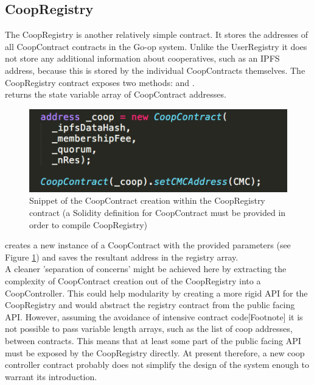 \subsection{CoopRegistry}
The CoopRegistry is another relatively simple contract. It stores the addresses of all CoopContract contracts in the Go-op system. Unlike the UserRegistry it does not store any additional information about cooperatives, such as an IPFS address, because this is stored by the individual CoopContracts themselves. The CoopRegistry contract exposes two methods:  and . \\

 returns the state variable array of CoopContract addresses. \\
 \begin{figure}
\centering
\includegraphics[width=\textwidth]{Figures/CoopRegistry}
\decoRule
\caption[]{Snippet of the CoopContract creation within the CoopRegistry contract (a Solidity definition for CoopContract must be provided in order to compile CoopRegistry) }
\label{fig:CoopRegistry}
\end{figure}

 creates a new instance of a CoopContract with the provided parameters (see Figure \ref{fig:CoopRegistry}) and saves the resultant address in the registry array.\\

A cleaner 'separation of concerns' might be achieved here by extracting the complexity of CoopContract creation out of the CoopRegistry into a CoopController. This could help modularity by creating a more rigid API for the CoopRegistry and would abstract the registry contract from the public facing API. However, assuming the avoidance of intensive contract code[Footnote] it is not possible to pass variable length arrays, such as the list of coop addresses, between contracts. This means that at least some part of the public facing API must be exposed by the CoopRegistry directly. At present therefore, a new coop controller contract probably does not simplify the design of the system enough to warrant its introduction. \\


